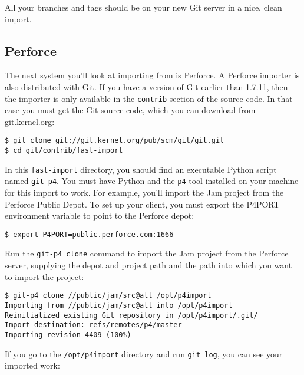 \documentclass[a4paper]{book}
\newcounter{tab}[chapter]
\begin{document}
All your branches and tags should be on your new Git server in a nice, clean import.

\subsection{Perforce}\label{perforce}

The next system you'll look at importing from is Perforce. A Perforce importer is also distributed with Git. If you have a version of Git earlier than 1.7.11, then the importer is only available in the \texttt{contrib} section of the source code. In that case you must get the Git source code, which you can download from git.kernel.org:

\begin{shaded}\begin{verbatim}
$ git clone git://git.kernel.org/pub/scm/git/git.git
$ cd git/contrib/fast-import
\end{verbatim}\end{shaded}

In this \texttt{fast-import} directory, you should find an executable Python script named \texttt{git-p4}. You must have Python and the \texttt{p4} tool installed on your machine for this import to work. For example, you'll import the Jam project from the Perforce Public Depot. To set up your client, you must export the P4PORT environment variable to point to the Perforce depot:

\begin{shaded}\begin{verbatim}
$ export P4PORT=public.perforce.com:1666
\end{verbatim}\end{shaded}

Run the \texttt{git-p4 clone} command to import the Jam project from the Perforce server, supplying the depot and project path and the path into which you want to import the project:

\begin{shaded}\begin{verbatim}
$ git-p4 clone //public/jam/src@all /opt/p4import
Importing from //public/jam/src@all into /opt/p4import
Reinitialized existing Git repository in /opt/p4import/.git/
Import destination: refs/remotes/p4/master
Importing revision 4409 (100%)
\end{verbatim}\end{shaded}

If you go to the \texttt{/opt/p4import} directory and run \texttt{git log}, you can see your imported work:
\end{document}
